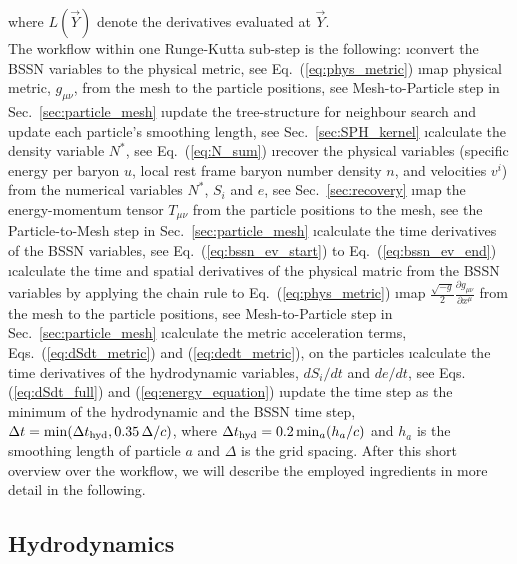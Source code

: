 \documentclass[useAMS,usenatbib]{iopart}
\begin{document}
\eea
where $L(\vec{Y})$ denote the derivatives evaluated at $\vec{Y}$.\\
The workflow within one Runge-Kutta sub-step is the following:
\ben
\i convert the BSSN variables to the physical metric, see Eq.~(\ref{eq:phys_metric})
\i map physical metric, $g_{\mu\nu}$, from the mesh to the particle positions, see Mesh-to-Particle step in Sec.~\ref{sec:particle_mesh}
\i update the tree-structure for neighbour search and update each particle's smoothing length, see Sec.~\ref{sec:SPH_kernel}
\i calculate the density variable $N^\ast$, see Eq.~(\ref{eq:N_sum})
\i recover the physical variables (specific energy per baryon $u$, local rest frame baryon number density $n$, and velocities $v^i$) from the numerical variables $N^\ast$, $S_i$ and $e$, see Sec.~\ref{sec:recovery}
\i map the energy-momentum tensor $T_{\mu \nu}$ from the particle positions to the mesh, see the Particle-to-Mesh step in Sec.~\ref{sec:particle_mesh}
\i calculate the time derivatives of the BSSN variables, see Eq.~(\ref{eq:bssn_ev_start}) to Eq.~(\ref{eq:bssn_ev_end})
\i calculate the time and spatial derivatives of the physical matric from the
BSSN variables by applying the chain rule to Eq.~(\ref{eq:phys_metric})
\i map $\frac{\sqrt{-g}}{2}\frac{\partial g_{\mu\nu}}{\partial x^{\mu}}$ from the mesh to the particle positions, see Mesh-to-Particle step in Sec.~\ref{sec:particle_mesh}
\i calculate the metric acceleration terms, Eqs.~(\ref{eq:dSdt_metric}) and (\ref{eq:dedt_metric}), on the particles
\i calculate the time derivatives of the hydrodynamic variables, $dS_i/dt$ and $de/dt$, see Eqs.(\ref{eq:dSdt_full}) and (\ref{eq:energy_equation})
\i update the time step as the minimum of the hydrodynamic and the BSSN time step, $\Delta t= {\rm min}(\Delta t_{\rm hyd},0.35\, \Delta/c)$, where $\Delta t_{\rm hyd}= 0.2\, {\rm min}_a (h_a/c)$ and $h_a$ is the smoothing length of  particle $a$ and $\Delta$ is the grid spacing.
\een
After this short overview over the workflow, we will describe the employed ingredients in more detail in the following.


\subsection{Hydrodynamics}
\label{sec:hydro}
\end{document}
